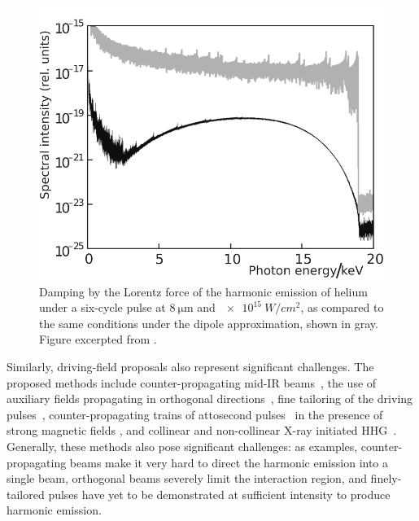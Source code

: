 \begin{figure}[t!]
  \centering
  \includegraphics[scale=1.15]{9-Nondipole-HHG/Figures/figure9A.png}
  \caption[
  Damping of HHG emission by the Lorentz force at $\SI{8}{\micro\meter}$ and $\SI{e15}{W/cm^2}$, by several orders of magnitude with respect to the dipole-approximation ideal, as calculated by A.S. Emelina~et~al.
  ]{
  Damping by the Lorentz force of the harmonic emission of helium under a six-cycle pulse at $\SI{8}{\micro\meter}$ and $\SI{e15}{W/cm^2}$, as compared to the same conditions under the dipole approximation, shown in gray.
  Figure excerpted from .
  }
\label{f6-emelina-original-spectrum}
\end{figure}




Similarly, driving-field proposals also represent significant challenges. The proposed methods include 
%
counter-propagating mid-IR beams~\cite{ taranukhin_relativistic_2000, taranukhin_high-order_2002, milosevic_lasers-attosecond-nuclear_2004, verschl_relativistic_2007,verschl_consecutive-laser-pulses_2007}, 
%
the use of auxiliary fields propagating in orthogonal directions~\cite{ chirila_nondipole_2002}, 
%
fine tailoring of the driving pulses~\cite{klaiber_relativistic_2006, klaiber_fully_2007,liu_laser-guided_2009}, 
%
coun\-ter-propagating trains of attosecond pulses~\cite{ hatsagortsyan_laser_driven_2008, kohler_phase-matched_2011} 
in the presence of strong magnetic fields \cite{verschl_refocussed_2007}, 
%
and collinear and non-collinear X-ray initiated HHG~\cite{klaiber_coherent_2008, kohler_macroscopic_2012}. 
%
Generally, these methods also pose significant challenges: as examples, counter-propagating beams make it very hard to direct the harmonic emission into a single beam, orthogonal beams severely limit the interaction region, and finely-tailored pulses have yet to be demonstrated at sufficient intensity to produce harmonic emission. 

